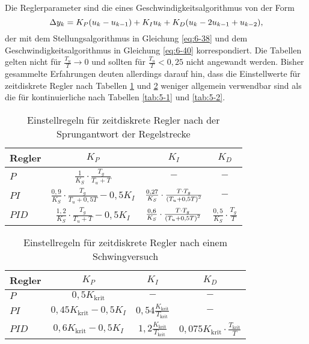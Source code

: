 Die Reglerparameter sind die eines Geschwindigkeitsalgorithmus von der Form
\begin{equation}
	\Delta y_k = K_P \parentheses*{u_k - u_{k - 1}} + K_I u_k + K_D \parentheses*{u_k - 2u_{k - 1} + u_{k - 2}},
\end{equation}
der mit dem Stellungsalgorithmus in Gleichung \eqref{eq:6-38} und dem Geschwindigkeitsalgorithmus in Gleichung \eqref{eq:6-40} korrespondiert.
Die Tabellen gelten nicht für \(\frac{T_u}{T} \to 0\) und sollten für \(\frac{T_u}{T} < 0,25\) nicht angewandt werden.
Bisher gesammelte Erfahrungen deuten allerdings darauf hin, dass die Einstellwerte für zeitdiskrete Regler nach Tabellen \ref{tab:6-1} und \ref{tab:6-2} weniger allgemein verwendbar sind als die für kontinuierliche nach Tabellen \ref{tab:5-1} und \ref{tab:5-2}.
\begin{table}[ht]
	\centering
	\begin{tabular}{l|ccc}
		\toprule
		Regler & \(K_P\) & \(K_I\) & \(K_D\)\\
		\midrule
		\(P\) & \(\frac{1}{K_S} \cdot \frac{T_g}{T_u + T}\) & \(-\) & \(-\)\\
		\(PI\) & \(\frac{0,9}{K_S} \cdot \frac{T_g}{T_u + 0,5T} - 0,5K_I\) & \(\frac{0,27}{K_S} \cdot \frac{T \cdot T_g}{\parentheses*{T_u + 0,5T}^2}\) & \(-\)\\
		\(PID\) & \(\frac{1,2}{K_S} \cdot \frac{T_g}{T_u + T} - 0,5K_I\) & \(\frac{0,6}{K_S} \cdot \frac{T \cdot T_g}{\parentheses*{T_u + 0,5T}^2}\) & \(\frac{0,5}{K_S} \cdot \frac{T_g}{T}\)\\
		\bottomrule
	\end{tabular}
	\caption{Einstellregeln für zeitdiskrete Regler nach der Sprungantwort der Regelstrecke}
	\label{tab:6-1}
\end{table}
\begin{table}[ht]
	\centering
	\begin{tabular}{l|ccc}
		\toprule
		Regler & \(K_P\) & \(K_I\) & \(K_D\)\\
		\midrule
		\(P\) & \(0,5K_{\text{krit}}\) & \(-\) & \(-\)\\
		\(PI\) & \(0,45K_{\text{krit}} - 0,5K_I\) & \(0,54\frac{K_{\text{krit}}}{T_{\text{krit}}}\) & \(-\)\\
		\(PID\) & \(0,6K_{\text{krit}} - 0,5K_I\) & \(1,2\frac{K_{\text{krit}}}{T_{\text{krit}}}\) & \(0,075K_{\text{krit}} \cdot \frac{T_{\text{krit}}}{T}\)\\
		\bottomrule
	\end{tabular}
	\caption{Einstellregeln für zeitdiskrete Regler nach einem Schwingversuch}
	\label{tab:6-2}
\end{table}
